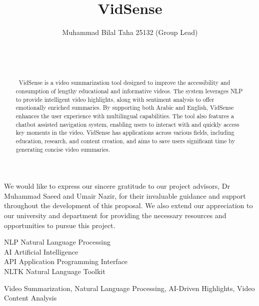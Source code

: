 \documentclass{bscs}
\title{VidSense}
\author{Muhammad Bilal Taha 25132 (Group Lead)\\
         [Muhammad Muaz Arif]\\
         [Muhammad Wasay]\\
         [Syed Bilal Ali]\\
         [Ali Iqbal]}
\begin{document}
\frontmatter
\maketitle

\begin{acknowledgement}
We would like to express our sincere gratitude to our project advisors, Dr Muhammad Saeed and 
Umair Nazir, for their invaluable guidance and support throughout the development of this 
proposal. We also extend our appreciation to our university and department for providing the 
necessary resources and opportunities to pursue this project. 
\end{acknowledgement}

\tableofcontents
\listoftables
{}
\listoffigures
{}
\begin{abbreviations}
    NLP \> Natural Language Processing \\
    AI \> Artificial Intelligence \\
    API \> Application Programming Interface \\
    NLTK \> Natural Language Toolkit \\
\end{abbreviations}
\begin{abstract}
\ VidSense is a video summarization tool designed to improve the accessibility and consumption of lengthy educational and informative videos. The system leverages NLP to provide intelligent video highlights, along with sentiment analysis to offer emotionally enriched summaries. By supporting both Arabic and English, VidSense enhances the user experience with multilingual capabilities. The tool also features a chatbot assisted navigation system, enabling users to interact with and quickly access key moments in the video. VidSense has applications across various fields, including education, research, and content creation, and aims to save users significant time by generating concise video summaries.    
\end{abstract}

\begin{keywords}
Video Summarization, Natural Language Processing, AI-Driven Highlights, Video Content Analysis
\end{keywords}


\mainmatter
\end{document}
